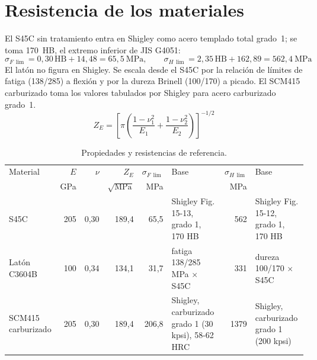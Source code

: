 \documentclass[11pt,a4paper]{article}
\begin{document}
\section{Resistencia de los materiales}
El S45C sin tratamiento entra en Shigley como acero templado total grado~1; se toma 170~HB, el extremo inferior de JIS G4051:
\begin{equation}
\sigma_{F\,\lim}=0{,}30\,\mathrm{HB}+14{,}48=65{,}5\ \text{MPa},\qquad
\sigma_{H\,\lim}=2{,}35\,\mathrm{HB}+162{,}89=562{,}4\ \text{MPa}
\end{equation}
El latón no figura en Shigley. Se escala desde el S45C por la relación de límites de fatiga (138/285) a flexión y por la dureza
Brinell (100/170) a picado. El SCM415 carburizado toma los valores tabulados por Shigley para acero carburizado grado~1.
\begin{equation}
Z_E=\left[\pi\left(\frac{1-\nu_1^2}{E_1}+\frac{1-\nu_2^2}{E_2}\right)\right]^{-1/2}
\end{equation}
\begin{table}[H]\centering\small\setlength{\tabcolsep}{4pt}
\caption{Propiedades y resistencias de referencia.}\label{tab:mat}
\begin{tabular}{l r r r r p{3.6cm} r p{3.2cm}}
\toprule
Material & $E$ & $\nu$ & $Z_E$ & $\sigma_{F\,\lim}$ & Base & $\sigma_{H\,\lim}$ & Base\\
 & GPa & & $\sqrt{\text{MPa}}$ & MPa & & MPa & \\
\midrule
S45C & 205 & 0,30 & 189,4 & 65,5 & Shigley Fig. 15-13, grado 1, 170 HB & 562 & Shigley Fig. 15-12, grado 1, 170 HB \\
Latón C3604B & 100 & 0,34 & 134,1 & 31,7 & fatiga 138/285 MPa $\times$ S45C & 331 & dureza 100/170 $\times$ S45C \\
SCM415 carburizado & 205 & 0,30 & 189,4 & 206,8 & Shigley, carburizado grado 1 (30 kpsi), 58-62 HRC & 1379 & Shigley, carburizado grado 1 (200 kpsi) \\
\bottomrule\end{tabular}\end{table}
\end{document}
